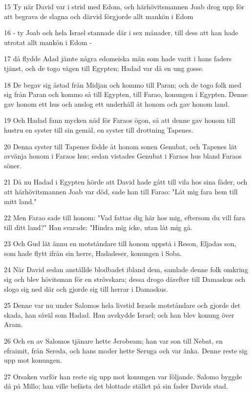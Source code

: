 \par 15 Ty när David var i strid med Edom, och härhövitsmannen Joab drog upp för att begrava de slagna och därvid förgjorde allt mankön i Edom
\par 16 - ty Joab och hela Israel stannade där i sex månader, till dess att han hade utrotat allt mankön i Edom -
\par 17 då flydde Adad jämte några edomeiska män som hade varit i hans faders tjänst, och de togo vägen till Egypten; Hadad var då en ung gosse.
\par 18 De begav sig åstad från Midjan och kommo till Paran; och de togo folk med sig från Paran och kommo så till Egypten, till Farao, konungen i Egypten. Denne gav honom ett hus och anslog ett underhåll åt honom och gav honom land.
\par 19 Och Hadad fann mycken nåd för Faraos ögon, så att denne gav honom till hustru en syster till sin gemål, en syster till drottning Tapenes.
\par 20 Denna syster till Tapenes födde åt honom sonen Genubat, och Tapenes lät avvänja honom i Faraos hus; sedan vistades Genubat i Faraos hus bland Faraos söner.
\par 21 Då nu Hadad i Egypten hörde att David hade gått till vila hos sina fäder, och att härhövitsmannen Joab var död, sade han till Farao: "Låt mig fara hem till mitt land."
\par 22 Men Farao sade till honom: "Vad fattas dig här hos mig, eftersom du vill fara till ditt land?" Han svarade: "Hindra mig icke, utan låt mig gå.
\par 23 Och Gud lät ännu en motståndare till honom uppstå i Reson, Eljadas son, som hade flytt ifrån sin herre, Hadadeser, konungen i Soba.
\par 24 När David sedan anställde blodbadet ibland dem, samlade denne folk omkring sig och blev hövitsman för en strövskara; dessa drogo därefter till Damaskus och slogo sig ned där och gjorde sig till herrar i Damaskus.
\par 25 Denne var nu under Salomos hela livstid Israels motståndare och gjorde det skada, han såväl som Hadad. Han avskydde Israel; och han blev konung över Aram.
\par 26 Och en av Salomos tjänare hette Jerobeam; han var son till Nebat, en efraimit, från Sereda, och hans moder hette Seruga och var änka. Denne reste sig upp mot konungen.
\par 27 Orsaken varför han reste sig upp mot konungen var följande. Salomo byggde då på Millo; han ville befästa det blottade stället på sin fader Davids stad.
